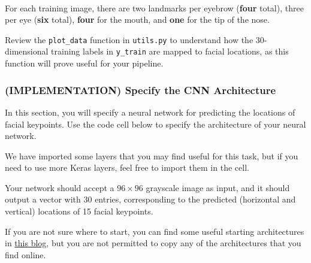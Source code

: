 \documentclass[11pt]{article}
\begin{document}
    \begin{center}
    \end{center}
    { \hspace*{\fill} \\}
    
    For each training image, there are two landmarks per eyebrow
(\textbf{four} total), three per eye (\textbf{six} total), \textbf{four}
for the mouth, and \textbf{one} for the tip of the nose.

Review the \texttt{plot\_data} function in \texttt{utils.py} to
understand how the 30-dimensional training labels in \texttt{y\_train}
are mapped to facial locations, as this function will prove useful for
your pipeline.

    \subsubsection{(IMPLEMENTATION) Specify the CNN
Architecture}\label{implementation-specify-the-cnn-architecture}

In this section, you will specify a neural network for predicting the
locations of facial keypoints. Use the code cell below to specify the
architecture of your neural network.

We have imported some layers that you may find useful for this task, but
if you need to use more Keras layers, feel free to import them in the
cell.

Your network should accept a \(96 \times 96\) grayscale image as input,
and it should output a vector with 30 entries, corresponding to the
predicted (horizontal and vertical) locations of 15 facial keypoints.

If you are not sure where to start, you can find some useful starting
architectures in
\href{http://danielnouri.org/notes/2014/12/17/using-convolutional-neural-nets-to-detect-facial-keypoints-tutorial/}{this
blog}, but you are not permitted to copy any of the architectures that
you find online.
\end{document}
